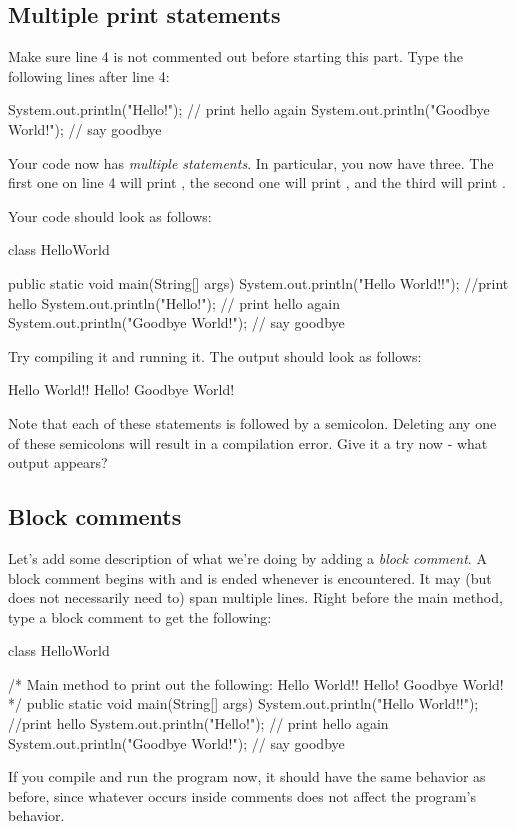 \subsection{Multiple print statements}

Make sure line 4 is not commented out before starting this part.
Type the following lines after line 4:
\begin{code}
System.out.println("Hello!"); // print hello again
System.out.println("Goodbye World!"); // say goodbye
\end{code}
Your code now has \emph{multiple statements}. In particular, you now have three. The first one on line 4 will print
, the second one will print , and the third will print .

Your code should look as follows:
\begin{code}
class HelloWorld {
    
    public static void main(String[] args) {
        System.out.println("Hello World!!"); //print hello
        System.out.println("Hello!"); // print hello again
        System.out.println("Goodbye World!"); // say goodbye
    }
    
}
\end{code}
Try compiling it and running it. The output should look as follows:
\begin{code}
Hello World!!
Hello!
Goodbye World!
\end{code}

Note that each of these statements is followed by a semicolon.
Deleting any one of these semicolons will result in a compilation error. Give it a try now - what output appears? 

\subsection{Block comments}

Let's add some description of what we're doing by adding a \emph{block comment}.
A block comment begins with \ic{/*} and is ended whenever \ic{*/} is encountered.
It may (but does not necessarily need to) span multiple lines.
Right before the main method, type a block comment to get the following:
\begin{code}
class HelloWorld {

    /* Main method to print out the following:
         Hello World!!
         Hello!
         Goodbye World!
    */
    public static void main(String[] args) {
        System.out.println("Hello World!!"); //print hello
        System.out.println("Hello!"); // print hello again
        System.out.println("Goodbye World!"); // say goodbye
    }

}
\end{code}
If you compile and run the program now, it should have the same behavior as before, since whatever occurs
inside comments does not affect the program's behavior.

